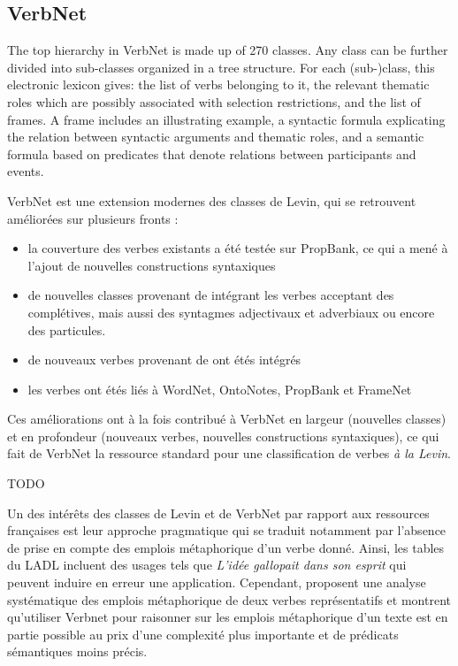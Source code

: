 \subsection{VerbNet}

The top hierarchy in VerbNet is made up of 270 classes. Any class can be
further divided into sub-classes organized in a tree structure. For each
(sub-)class, this electronic lexicon gives:  the list of verbs belonging to it,
the relevant thematic roles which are possibly associated with selection
restrictions, and the list of frames. A frame includes an illustrating example,
a syntactic formula explicating the relation between syntactic arguments and
thematic roles, and a semantic formula  based on predicates that denote
relations between participants and events.


VerbNet est une extension modernes des classes de Levin, qui se retrouvent
améliorées sur plusieurs fronts :

\begin{itemize}

    \item la couverture des verbes existants a été testée sur PropBank, ce qui
        a mené à l'ajout de nouvelles constructions syntaxiques

    \item de nouvelles classes provenant de \cite{korhonen2004extended}
        intégrant les verbes acceptant des complétives, mais aussi des
        syntagmes adjectivaux et adverbiaux ou encore des particules.

    \item de nouveaux verbes provenant de \cite{dorr2001lcs} ont étés intégrés

    \item les verbes ont étés liés à WordNet, OntoNotes, PropBank et FrameNet
        \citep{palmer2009semlink}

\end{itemize}

Ces améliorations ont à la fois contribué à VerbNet en largeur (nouvelles
classes) et en profondeur (nouveaux verbes, nouvelles constructions
syntaxiques), ce qui fait de VerbNet la ressource standard pour une
classification de verbes \textit{à la Levin}.

TODO

Un des intérêts des classes de Levin et de VerbNet par rapport aux ressources
françaises est leur approche pragmatique qui se traduit notamment par l'absence
de prise en compte des emplois métaphorique d'un verbe donné. Ainsi, les tables
du LADL incluent des usages tels que \textit{L'idée gallopait dans son esprit}
qui peuvent induire en erreur une application. Cependant,
\cite{brown2012semantic} proposent une analyse systématique des emplois
métaphorique de deux verbes représentatifs et montrent qu'utiliser Verbnet pour
raisonner sur les emplois métaphorique d'un texte est en partie possible au
prix d'une complexité plus importante et de prédicats sémantiques moins précis.

